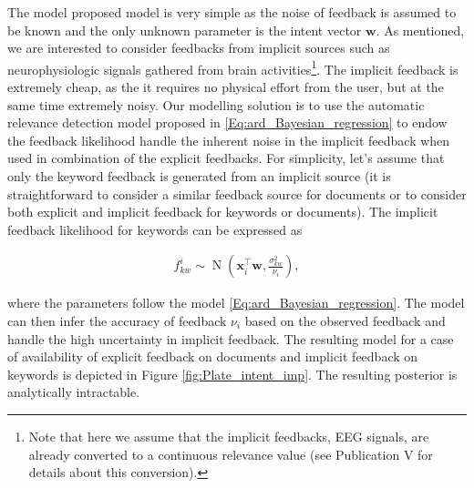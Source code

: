 \documentclass[dissertation,math,vertlayout,pdfa,colorlinks]{aaltoseries}
\newcommand{\bw}{\bm{w}}
\DeclareMathOperator{\normalpdf}{N}
\newcommand{\tp}{^{\top}}
\begin{document}
The model proposed model is very simple as the noise of feedback is assumed to be known and the only unknown parameter is the intent vector $\bw$. As mentioned, we are interested to consider feedbacks from implicit sources such as neurophysiologic signals gathered from brain activities\footnote{Note that here we assume that the implicit feedbacks, EEG signals, are already converted to a continuous relevance value (see Publication V for details about this conversion).}. The implicit feedback is extremely cheap, as the it requires no physical effort from the user, but at the same time extremely noisy. Our modelling solution is to use the automatic relevance detection model proposed in \ref{Eq:ard_Bayesian_regression} to endow the feedback likelihood handle the inherent noise in the implicit feedback when used in combination of the explicit feedbacks. For simplicity, let's assume that only the keyword feedback is generated from an implicit source (it is straightforward to consider a similar feedback source for documents or to consider both explicit and implicit feedback for keywords or documents). The implicit feedback likelihood for keywords can be expressed as 

\begin{align}\label{Eq:imp_fb_on_kw} 
f_{kw}^{i} \sim \normalpdf(\bm{x}_i\tp\bw,\frac{\sigma_{kw}^2}{\nu_i}),
\end{align}  

\noindent where the parameters follow the model \ref{Eq:ard_Bayesian_regression}. The model can then infer the accuracy of feedback $\nu_i$ based on the observed feedback and handle the high uncertainty in implicit feedback. The resulting model for a case of availability of explicit feedback on documents and implicit feedback on keywords is depicted in Figure \ref{fig:Plate_intent_imp}. The resulting posterior is analytically intractable.  
\end{document}
